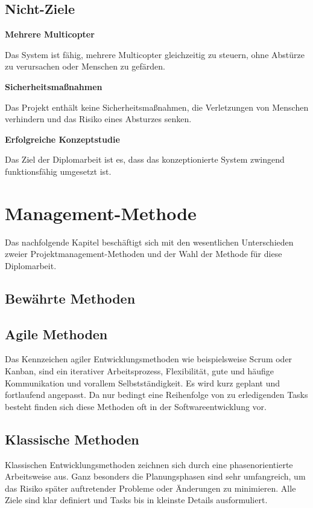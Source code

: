   \subsection{Nicht-Ziele}
  \textbf{Mehrere Multicopter}

  Das System ist fähig, mehrere Multicopter gleichzeitig zu steuern, ohne Abstürze
  zu verursachen oder Menschen zu gefärden.

  \textbf{Sicherheitsmaßnahmen}

  Das Projekt enthält keine Sicherheitsmaßnahmen, die Verletzungen von Menschen
  verhindern und das Risiko eines Absturzes senken.

  \textbf{Erfolgreiche Konzeptstudie}

  Das Ziel der Diplomarbeit ist es, dass das konzeptionierte System zwingend
  funktionsfähig umgesetzt ist.

\section{Management-Methode}
Das nachfolgende Kapitel beschäftigt sich mit den wesentlichen Unterschieden
zweier Projektmanagement-Methoden und der Wahl der Methode für diese Diplomarbeit.

  \subsection{Bewährte Methoden}
  \subsection*{Agile Methoden}
  Das Kennzeichen agiler Entwicklungsmethoden wie beispielsweise Scrum oder Kanban, sind
  ein iterativer Arbeitsprozess, Flexibilität, gute und häufige Kommunikation und vorallem
  Selbstständigkeit. Es wird kurz geplant und fortlaufend angepasst. Da nur bedingt eine Reihenfolge
  von zu erledigenden Tasks besteht finden sich diese Methoden oft in der Softwareentwicklung vor.

  \subsection*{Klassische Methoden}
  Klassischen Entwicklungsmethoden zeichnen sich durch eine phasenorientierte Arbeitsweise aus.
  Ganz besonders die Planungsphasen sind sehr umfangreich, um das Risiko später auftretender Probleme oder
  Änderungen zu minimieren. Alle Ziele sind klar definiert und Tasks bis in kleinste Details ausformuliert.

